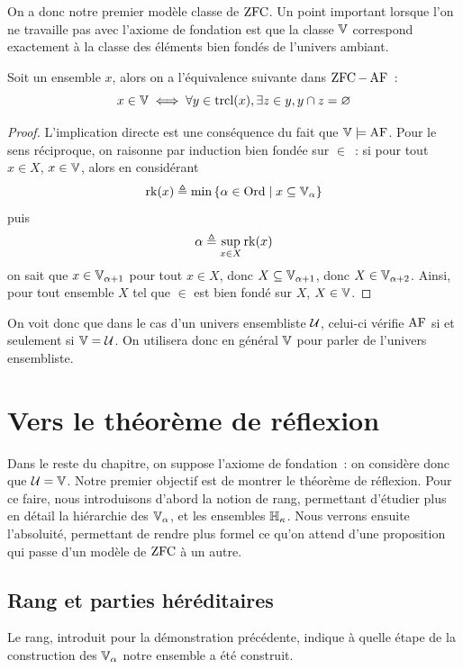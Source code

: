 On a donc notre premier modèle classe de $\operatorname{ZFC}$. Un point important lorsque l'on
ne travaille pas  avec l'axiome de fondation est que la
classe $\mathbb V$ correspond exactement à la classe des éléments bien fondés de
l'univers ambiant.

\begin{proposition}
  Soit un ensemble $x$, alors on a l'équivalence suivante dans $\operatorname{ZFC}-\operatorname{AF}$~:
  \[x\in \mathbb V \iff
  \forall y \in \operatorname{trcl}(x), \exists z \in y, y \cap z = \varnothing\]
\end{proposition}

\begin{proof}
  L'implication directe est une conséquence du fait que $\mathbb V\models \operatorname{AF}$.
  Pour le sens réciproque, on raisonne par induction bien fondée sur $\in$~:
  si pour tout $x \in X$, $x \in \mathbb V$, alors en considérant
  \[\operatorname{rk}(x) \triangleq \min\left\{ \alpha \in \operatorname{Ord} \;\middle\vert\; x \subseteq\mathbb V_\alpha \right\}\]
  puis
  \[\alpha \triangleq \sup_{x \in X} \operatorname{rk}(x)\]
  on sait que $x\in \mathbb V_{\alpha+1}$ pour tout $x \in X$, donc
  $X\subseteq \mathbb V_{\alpha+1}$, donc $X \in \mathbb V_{\alpha + 2}$.
  Ainsi, pour tout ensemble $X$ tel que $\in$ est bien fondé sur $X$,
  $X \in \mathbb V$.
\end{proof}

On voit donc que dans le cas d'un univers ensembliste $\mathcal{U}$, celui-ci
vérifie $\operatorname{AF}$ si et seulement si $\mathbb V = \mathcal{U}$. On utilisera donc en
général $\mathbb V$ pour parler de l'univers ensembliste.

\section{Vers le théorème de réflexion}

Dans le reste du chapitre, on suppose l'axiome de fondation~: on considère donc
que $\mathcal{U} = \mathbb V$. Notre premier objectif est de montrer le théorème
de réflexion. Pour ce faire, nous introduisons d'abord la notion de rang,
permettant d'étudier plus en détail la hiérarchie des $\mathbb V_\alpha$, et les
ensembles $\mathbb H_\kappa$. Nous verrons ensuite l'absoluité, permettant de rendre
plus formel ce qu'on attend d'une proposition qui passe d'un modèle de $\operatorname{ZFC}$
à un autre.

\subsection{Rang et parties héréditaires}

Le rang, introduit pour la démonstration précédente, indique à quelle étape de
la construction des $\mathbb V_\alpha$ notre ensemble a été construit.

